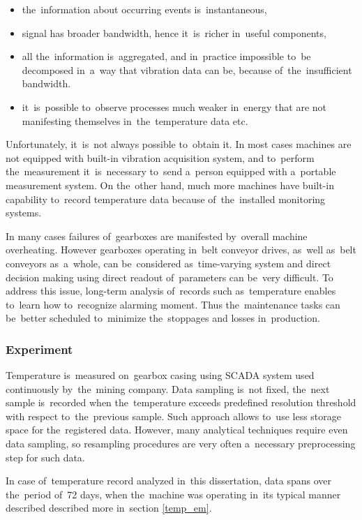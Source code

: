 \begin{itemize}
  \item the~information about occurring events is~instantaneous,
  \item signal has broader bandwidth, hence it~is~richer in~useful components,
  \item all the~information is~aggregated, and in~practice impossible to~be decomposed in~a~way that vibration data can be, because of~the~insufficient bandwidth.
  \item it~is~possible to~observe processes much weaker in~energy that are not manifesting themselves in~the~temperature data etc.
\end{itemize}

Unfortunately, it~is~not always possible to~obtain it. In most cases machines are not equipped with built-in vibration acquisition system, and to~perform the~measurement it~is~necessary to~send a~person equipped with a~portable measurement system. On the~other hand, much more machines have built-in capability to~record temperature data because of~the~installed monitoring systems.

In many cases failures of~gearboxes are manifested by~overall machine overheating. However gearboxes operating in~belt conveyor drives, as~well as~belt conveyors as~a~whole, can be~considered as~time-varying system and direct decision making using direct readout of~parameters can be~very difficult. To address this issue, long-term analysis of~records such as~temperature enables to~learn how to~recognize alarming moment. Thus the~maintenance tasks can be~better scheduled to~minimize the~stoppages and losses in~production. 

\subsubsection{Experiment}
Temperature is~measured on~gearbox casing using SCADA system used continuously by~the~mining company. Data sampling is~not fixed, the~next sample is~recorded when the~temperature exceeds predefined resolution threshold with respect to~the~previous sample. Such approach allows to~use less storage space for the~registered data. However, many analytical techniques require even data sampling, so resampling procedures are very often a~necessary preprocessing step for such data.

In case of~temperature record analyzed in~this dissertation, data spans over the~period of~72 days, when the~machine was operating in~its typical manner described described more in~section \ref{temp_em}. 